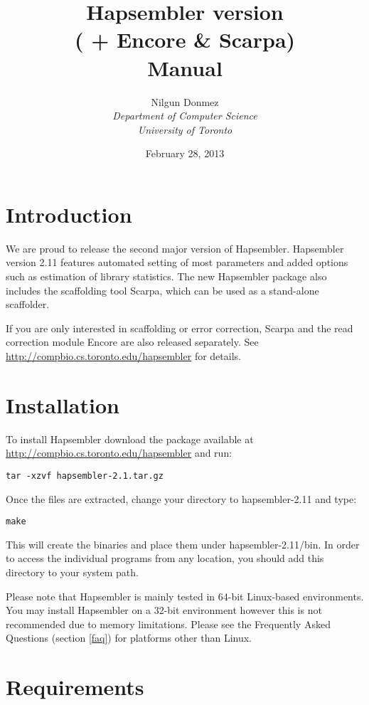 \documentclass[12pt,a4paper]{report}
\title{Hapsembler version \hapversion{} \\ ( + Encore \& Scarpa) \\ Manual }
\author{Nilgun Donmez \\
\emph{Department of Computer Science} \\
\emph{University of Toronto} }
\date{February 28, 2013}
\newcommand{\hapversion}{2.11}
\begin{document}
\maketitle
\tableofcontents
\newpage

\renewcommand*\thesection{\arabic{section}}

\section{Introduction}

We are proud to release the second major version of Hapsembler. Hapsembler version \hapversion{} features automated setting of most parameters and added options such as estimation of library statistics. The new Hapsembler package also includes the scaffolding tool Scarpa, which can be used as a stand-alone scaffolder. 

If you are only interested in scaffolding or error correction, Scarpa and the read correction module Encore are also released separately. See \url{http://compbio.cs.toronto.edu/hapsembler} for details. 

\section{Installation}

To install Hapsembler download the package available at \url{http://compbio.cs.toronto.edu/hapsembler} and run:

\begin{verbatim}
tar -xzvf hapsembler-2.1.tar.gz
\end{verbatim}

Once the files are extracted, change your directory to hapsembler-\hapversion{} and type:

\begin{verbatim}
make
\end{verbatim}

This will create the binaries and place them under hapsembler-\hapversion{}/bin. In order to access the individual programs from any location, you should add this directory to your system path. 

Please note that Hapsembler is mainly tested in 64-bit Linux-based environments. You may install Hapsembler on a 32-bit environment however this is not recommended due to memory limitations. Please see the Frequently Asked Questions (section \ref{faq}) for platforms other than Linux.

\section{Requirements}
\end{document}

